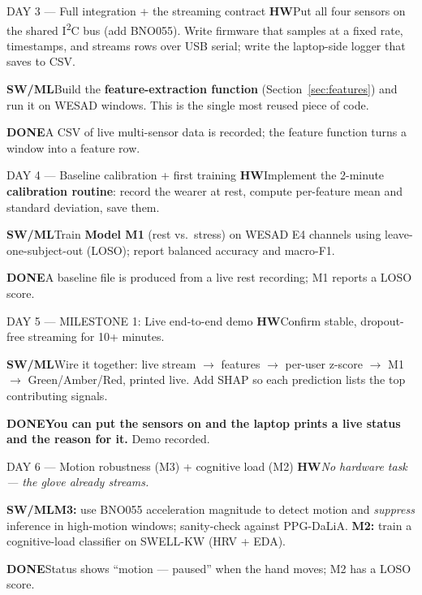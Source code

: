 \documentclass[11pt]{article}
\newcommand{\pill}[2]{\colorbox{#1}{\color{white}\footnotesize\sffamily\bfseries #2}}
\newcommand{\trk}[3]{\pill{#1}{#2}\hspace{5pt}#3\par}
\newcommand{\cardrule}{\par\vspace{3pt}{\color{black!12}\rule{\linewidth}{0.6pt}}\par\vspace{4pt}}
\begin{document}
\begin{daycard}{DAY 3 --- Full integration + the streaming contract}
\trk{nsteal}{HW}{Put all four sensors on the shared I\textsuperscript{2}C bus (add BNO055). Write
firmware that samples at a fixed rate, timestamps, and streams rows over USB serial; write the
laptop-side logger that saves to CSV.}
\smallskip
\trk{amber}{SW/ML}{Build the \textbf{feature-extraction function} (Section~\ref{sec:features}) and run
it on WESAD windows. This is the single most reused piece of code.}
\cardrule
\trk{nsgreen}{DONE}{A CSV of live multi-sensor data is recorded; the feature function turns a window
into a feature row.}
\end{daycard}

\begin{daycard}{DAY 4 --- Baseline calibration + first training}
\trk{nsteal}{HW}{Implement the 2-minute \textbf{calibration routine}: record the wearer at rest,
compute per-feature mean and standard deviation, save them.}
\smallskip
\trk{amber}{SW/ML}{Train \textbf{Model M1} (rest vs.\ stress) on WESAD E4 channels using
leave-one-subject-out (LOSO); report balanced accuracy and macro-F1.}
\cardrule
\trk{nsgreen}{DONE}{A baseline file is produced from a live rest recording; M1 reports a LOSO score.}
\end{daycard}

\begin{daycard}[amber]{DAY 5 --- MILESTONE 1: Live end-to-end demo}
\trk{nsteal}{HW}{Confirm stable, dropout-free streaming for 10+ minutes.}
\smallskip
\trk{amber}{SW/ML}{Wire it together: live stream $\to$ features $\to$ per-user z-score $\to$ M1
$\to$ Green/Amber/Red, printed live. Add SHAP so each prediction lists the top contributing signals.}
\cardrule
\trk{nsgreen}{DONE}{\textbf{You can put the sensors on and the laptop prints a live status and the
reason for it.} Demo recorded.}
\end{daycard}

\begin{daycard}{DAY 6 --- Motion robustness (M3) + cognitive load (M2)}
\trk{nsgrey}{HW}{\textit{No hardware task --- the glove already streams.}}
\smallskip
\trk{amber}{SW/ML}{\textbf{M3:} use BNO055 acceleration magnitude to detect motion and \emph{suppress}
inference in high-motion windows; sanity-check against PPG-DaLiA. \textbf{M2:} train a cognitive-load
classifier on SWELL-KW (HRV + EDA).}
\cardrule
\trk{nsgreen}{DONE}{Status shows ``motion --- paused'' when the hand moves; M2 has a LOSO score.}
\end{daycard}
\end{document}
